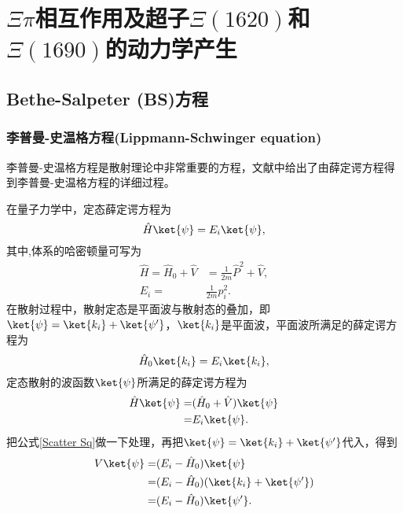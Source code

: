 \chapter[$\Xi\pi$相互作用及\\超子$\Xi(1620)$和$\Xi(1690)$的动力学产生]{$\Xi\pi$相互作用及超子$\Xi(1620)$和$\Xi(1690)$的动力学产生}
\section{Bethe-Salpeter (BS)方程}
\subsection{李普曼-史温格方程(Lippmann-Schwinger equation)}
李普曼-史温格方程是散射理论中非常重要的方程，文献\cite{PhysRev.79.469}中给出了由薛定谔方程得到李普曼-史温格方程的详细过程。\par
在量子力学中，定态薛定谔方程为
\begin{equation}
\label{Sq}
\hat{H}\ket{\psi}=E_{i}\ket{\psi},
\end{equation}
其中,体系的哈密顿量可写为
\begin{equation}
\begin{split}
	\hat{H}=\hat{H}_{0}+\hat{V}&=\frac{1}{2m}\hat{P}^2+\hat{V},\\[2ex]
	E_{i}=&\frac{1}{2m}p_{i}^2.
\end{split}
\end{equation}
在散射过程中，散射定态是平面波与散射态的叠加，即$\ket{\psi}=\ket{k_{i}}+\ket{\psi'}$，$\ket{k_{i}}$是平面波，平面波所满足的薛定谔方程为
\begin{equation}
\label{pweq}
\hat{H}_{0}\ket{k_{i}}=E_{i}\ket{k_{i}},
\end{equation}
定态散射的波函数$\ket{\psi}$所满足的薛定谔方程为
\begin{equation}
\label{Scatter Sq}
\begin{split}
	\hat{H}\ket{\psi}=&(\hat{H}_{0}+\hat{V})\ket{\psi}\\
	=&E_{i}\ket{\psi}.
\end{split}
\end{equation}
把公式\eqref{Scatter Sq}做一下处理，再把$\ket{\psi}=\ket{k_{i}}+\ket{\psi'}$代入，得到
\begin{equation}
	\begin{aligned}[b]
	V\ket{\psi}=&(E_{i}-\hat{H}_{0})\ket{\psi}\\
	=&(E_{i}-\hat{H}_{0})(\ket{k_{i}}+\ket{\psi'})\\
	=&(E_{i}-\hat{H}_{0})\ket{\psi'}.
	\end{aligned}
\end{equation}
